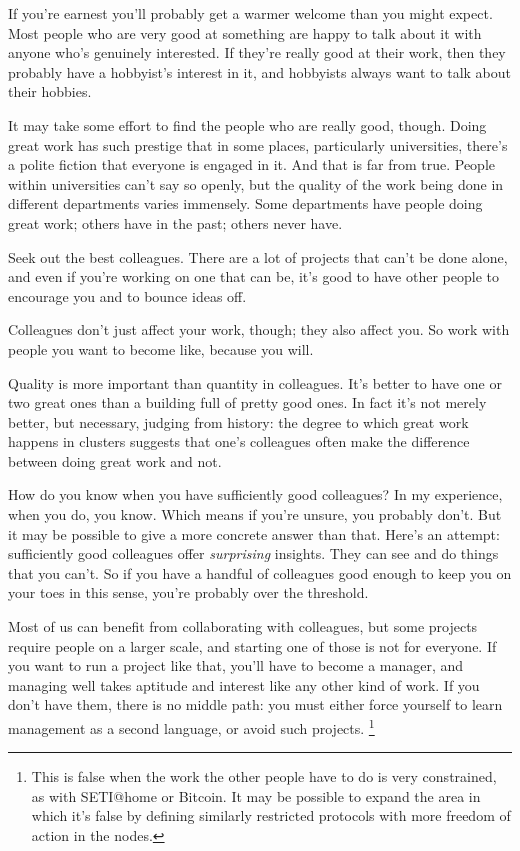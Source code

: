 \documentclass[12pt]{book}
\begin{document}
If you're earnest you'll probably get a warmer welcome than you might
expect. Most people who are very good at something are happy to talk
about it with anyone who's genuinely interested. If they're really good
at their work, then they probably have a hobbyist's interest in it, and
hobbyists always want to talk about their hobbies.

It may take some effort to find the people who are really good, though.
Doing great work has such prestige that in some places, particularly
universities, there's a polite fiction that everyone is engaged in it.
And that is far from true. People within universities can't say so
openly, but the quality of the work being done in different departments
varies immensely. Some departments have people doing great work; others
have in the past; others never have.

Seek out the best colleagues. There are a lot of projects that can't be
done alone, and even if you're working on one that can be, it's good to
have other people to encourage you and to bounce ideas off.

Colleagues don't just affect your work, though; they also affect you. So
work with people you want to become like, because you will.

Quality is more important than quantity in colleagues. It's better to
have one or two great ones than a building full of pretty good ones. In
fact it's not merely better, but necessary, judging from history: the
degree to which great work happens in clusters suggests that one's
colleagues often make the difference between doing great work and not.

How do you know when you have sufficiently good colleagues? In my
experience, when you do, you know. Which means if you're unsure, you
probably don't. But it may be possible to give a more concrete answer
than that. Here's an attempt: sufficiently good colleagues offer
\emph{surprising} insights. They can see and do things that you can't.
So if you have a handful of colleagues good enough to keep you on your
toes in this sense, you're probably over the threshold.

Most of us can benefit from collaborating with colleagues, but some
projects require people on a larger scale, and starting one of those is
not for everyone. If you want to run a project like that, you'll have to
become a manager, and managing well takes aptitude and interest like any
other kind of work. If you don't have them, there is no middle path: you
must either force yourself to learn management as a second language, or
avoid such projects. \footnote{This is false when the work the other people have to do is very
constrained, as with SETI@home or Bitcoin. It may be possible to expand
the area in which it's false by defining similarly restricted protocols
with more freedom of action in the nodes.}
\end{document}
